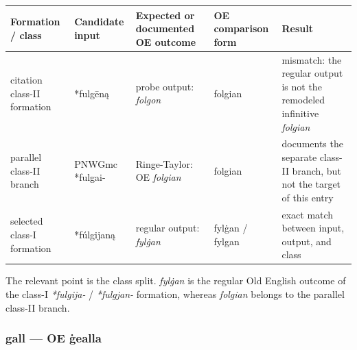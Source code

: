 \documentclass[
  british,
  a4paper,
]{article}
\newcounter{none} %
\begin{document}
{\def\LTcaptype{none} %
\begin{longtable}[]{@{}
  >{\raggedright\arraybackslash}p{}
  >{\raggedright\arraybackslash}p{}
  >{\raggedright\arraybackslash}p{}
  >{\raggedright\arraybackslash}p{}
  >{\raggedright\arraybackslash}p{}@{}}
\toprule\noalign{}
\begin{minipage}[b]{\linewidth}\raggedright
Formation / class
\end{minipage} & \begin{minipage}[b]{\linewidth}\raggedright
Candidate input
\end{minipage} & \begin{minipage}[b]{\linewidth}\raggedright
Expected or documented OE outcome
\end{minipage} & \begin{minipage}[b]{\linewidth}\raggedright
OE comparison form
\end{minipage} & \begin{minipage}[b]{\linewidth}\raggedright
Result
\end{minipage} \\
\midrule\noalign{}
\endhead
\bottomrule\noalign{}
\endlastfoot
citation class-II formation & *fulgēną & probe output: \emph{folgon} &
folgian & mismatch: the regular output is not the remodeled infinitive
\emph{folgian} \\
parallel class-II branch & PNWGmc *fulgai- & Ringe-Taylor: OE
\emph{folgian} & folgian & documents the separate class-II branch, but
not the target of this entry \\
selected class-I formation & *fúlgijaną & regular output: \emph{fylġan}
& fylġan / fylgan & exact match between input, output, and class \\
\end{longtable}
}

The relevant point is the class split. \emph{fylġan} is the regular Old
English outcome of the class-I \emph{*fulgija-} / \emph{*fulgjan-}
formation, whereas \emph{folgian} belongs to the parallel class-II
branch.

\subsubsection{gall --- OE ġealla}\label{gall-oe-ux121ealla}
\end{document}
